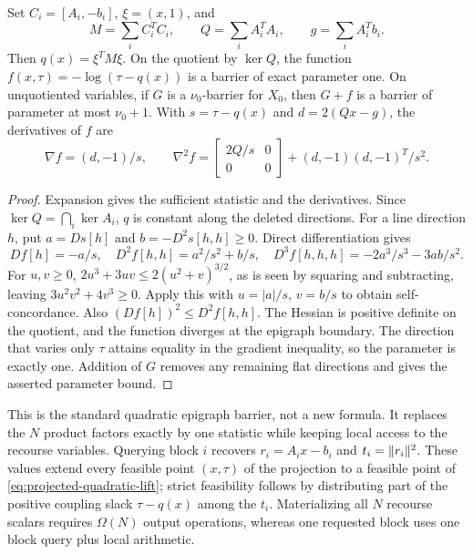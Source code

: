 \begin{proposition}\label{prop:projected-quadratic}
Set $C_i=[A_i,-b_i]$, $\xi=(x,1)$, and
\[
 M=\sum_i C_i^TC_i,\qquad Q=\sum_i A_i^TA_i,\qquad
 g=\sum_i A_i^Tb_i.
\]
Then $q(x)=\xi^TM\xi$.  On the quotient by $\ker Q$, the function
$f(x,\tau)=-\log(\tau-q(x))$ is a barrier of exact parameter one.
On unquotiented variables, if $G$ is a $\nu_0$-barrier for $X_0$, then
$G+f$ is a barrier of parameter at most $\nu_0+1$.
With $s=\tau-q(x)$ and $d=2(Qx-g)$, the derivatives of $f$ are
\begin{equation}\label{eq:projected-quadratic-hessian}
 \nabla f=(d,-1)/s,\qquad
 \nabla^2 f=\begin{bmatrix}2Q/s&0\\0&0\end{bmatrix}
              +(d,-1)(d,-1)^T/s^2.
\end{equation}
\end{proposition}
\begin{proof}
Expansion gives the sufficient statistic and the derivatives.  Since
$\ker Q=\bigcap_i\ker A_i$, $q$ is constant along the deleted directions.
For a line direction $h$, put $a=Ds[h]$ and
$b=-D^2s[h,h]\geq0$.  Direct differentiation gives
\[
 Df[h]=-a/s,\quad D^2f[h,h]=a^2/s^2+b/s,\quad
 D^3f[h,h,h]=-2a^3/s^3-3ab/s^2.
\]
For $u,v\geq0$, $2u^3+3uv\leq2(u^2+v)^{3/2}$, as is seen by
squaring and subtracting, leaving $3u^2v^2+4v^3\geq0$.
Apply this with $u=|a|/s$, $v=b/s$ to obtain self-concordance.
Also $(Df[h])^2\leq D^2f[h,h]$.  The Hessian is positive definite
on the quotient, and the function diverges at the epigraph boundary.
The direction that varies only $\tau$ attains equality in the gradient
inequality, so the parameter is exactly one.  Addition of $G$ removes any
remaining flat directions and gives the asserted parameter bound.
\end{proof}

This is the standard quadratic epigraph barrier, not a new formula.  It
replaces the $N$ product factors exactly by one statistic while keeping
local access to the recourse variables.
Querying block $i$ recovers $r_i=A_ix-b_i$ and $t_i=\lVert r_i\rVert^2$.  These
values extend every feasible point $(x,\tau)$ of the projection to a
feasible point of \eqref{eq:projected-quadratic-lift}; strict
feasibility follows by distributing part of the positive coupling slack
$\tau-q(x)$ among the $t_i$.  Materializing all $N$
recourse scalars requires $\Omega(N)$ output operations, whereas one
requested block uses one block query plus local arithmetic.


